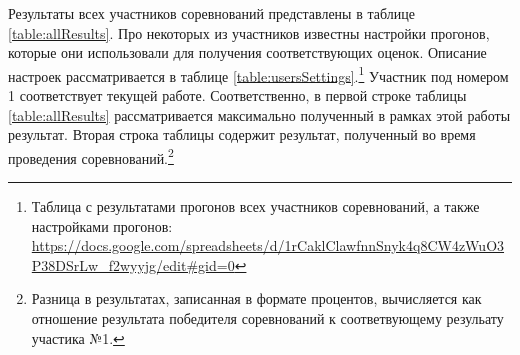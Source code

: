Результаты всех участников соревнований представлены в таблице \ref{table:allResults}.
Про некоторых из участников известны настройки прогонов, которые они использовали
для получения соответствующих оценок.
Описание настроек рассматривается в таблице \ref{table:usersSettings}.\footnote{
Таблица с результатами прогонов всех участников соревнований, а также настройками прогонов:
\url{https://docs.google.com/spreadsheets/d/1rCaklClawfnnSnyk4q8CW4zWuO3P38DSrLw_f2wyyjg/edit\#gid=0}
}
Участник под номером 1 соответствует текущей работе.
Соответственно, в первой строке таблицы \ref{table:allResults} рассматривается
максимально полученный в рамках этой работы результат.
Вторая строка таблицы содержит результат, полученный во время проведения соревнований.\footnote{
Разница в результатах, записанная в формате процентов, вычисляется как отношение
результата победителя соревнований к соответвующему резульату участика №1.
}


